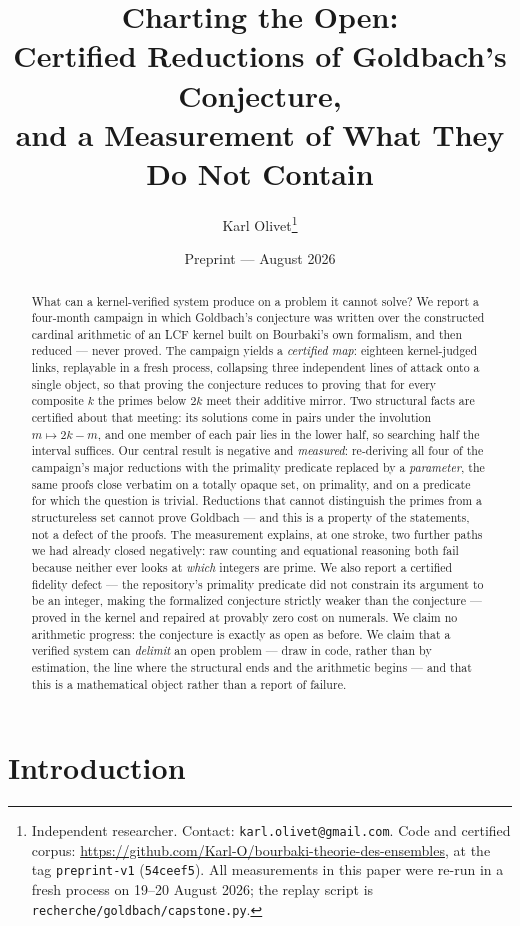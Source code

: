 \documentclass[11pt]{article}
\title{Charting the Open:\\
Certified Reductions of Goldbach's Conjecture,\\
and a Measurement of What They Do Not Contain}
\author{Karl Olivet\thanks{Independent researcher. Contact:
\texttt{karl.olivet@gmail.com}. Code and certified corpus: \url{https://github.com/Karl-O/bourbaki-theorie-des-ensembles}, at the tag
\texttt{preprint-v1} (\texttt{54ceef5}). All measurements in this paper were re-run in a
fresh process on 19--20 August 2026; the replay script is
\texttt{recherche/goldbach/capstone.py}.}}
\date{Preprint --- August 2026}
\theoremstyle{remark}\newtheorem{remark}{Remark}
\begin{document}
\maketitle

\begin{abstract}
What can a kernel-verified system produce on a problem it cannot solve? We report a
four-month campaign in which Goldbach's conjecture was written over the constructed
cardinal arithmetic of an LCF kernel built on Bourbaki's own formalism, and then
reduced --- never proved. The campaign yields a \emph{certified map}: eighteen
kernel-judged links, replayable in a fresh process, collapsing three independent lines
of attack onto a single object, so that proving the conjecture reduces to proving that
for every composite $k$ the primes below $2k$ meet their additive mirror. Two
structural facts are certified about that meeting: its solutions come in pairs under
the involution $m \mapsto 2k-m$, and one member of each pair lies in the lower half,
so searching half the interval suffices. Our central result is negative and
\emph{measured}: re-deriving all four of the campaign's major reductions with the
primality predicate replaced by a \emph{parameter}, the same proofs close verbatim on a
totally opaque set, on primality, and on a predicate for which the question is trivial. Reductions that
cannot distinguish the primes from a structureless set cannot prove Goldbach --- and
this is a property of the statements, not a defect of the proofs. The measurement
explains, at one stroke, two further paths we had already closed negatively: raw
counting and equational reasoning both fail because neither ever looks at \emph{which}
integers are prime. We also report a certified fidelity defect --- the repository's
primality predicate did not constrain its argument to be an integer, making the
formalized conjecture strictly weaker than the conjecture --- proved in the kernel and
repaired at provably zero cost on numerals. We claim no arithmetic progress: the
conjecture is exactly as open as before. We claim that a verified system can
\emph{delimit} an open problem --- draw in code, rather than by estimation, the line
where the structural ends and the arithmetic begins --- and that this is a mathematical
object rather than a report of failure.
\end{abstract}

\section{Introduction}
\end{document}
